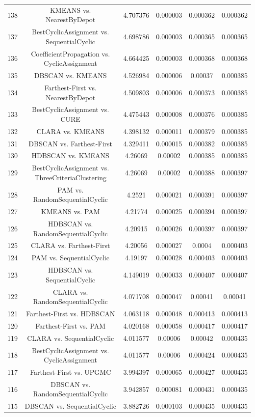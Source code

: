 \documentclass[a4paper,10pt]{article}
\begin{document}
\begin{landscape}
\begin{table}[!htp]
\begin{tabular}{cccccc}
138&KMEANS vs. NearestByDepot&4.707376&0.000003&0.000362&0.000362\\
137&BestCyclicAssignment vs. SequentialCyclic&4.698786&0.000003&0.000365&0.000365\\
136&CoefficientPropagation vs. CyclicAssignment&4.664425&0.000003&0.000368&0.000368\\
135&DBSCAN vs. KMEANS&4.526984&0.000006&0.00037&0.000385\\
134&Farthest-First vs. NearestByDepot&4.509803&0.000006&0.000373&0.000385\\
133&BestCyclicAssignment vs. CURE&4.475443&0.000008&0.000376&0.000385\\
132&CLARA vs. KMEANS&4.398132&0.000011&0.000379&0.000385\\
131&DBSCAN vs. Farthest-First&4.329411&0.000015&0.000382&0.000385\\
130&HDBSCAN vs. KMEANS&4.26069&0.00002&0.000385&0.000385\\
129&BestCyclicAssignment vs. ThreeCriteriaClustering&4.26069&0.00002&0.000388&0.000397\\
128&PAM vs. RandomSequentialCyclic&4.2521&0.000021&0.000391&0.000397\\
127&KMEANS vs. PAM&4.21774&0.000025&0.000394&0.000397\\
126&HDBSCAN vs. RandomSequentialCyclic&4.20915&0.000026&0.000397&0.000397\\
125&CLARA vs. Farthest-First&4.20056&0.000027&0.0004&0.000403\\
124&PAM vs. SequentialCyclic&4.19197&0.000028&0.000403&0.000403\\
123&HDBSCAN vs. SequentialCyclic&4.149019&0.000033&0.000407&0.000407\\
122&CLARA vs. RandomSequentialCyclic&4.071708&0.000047&0.00041&0.00041\\
121&Farthest-First vs. HDBSCAN&4.063118&0.000048&0.000413&0.000413\\
120&Farthest-First vs. PAM&4.020168&0.000058&0.000417&0.000417\\
119&CLARA vs. SequentialCyclic&4.011577&0.00006&0.00042&0.000435\\
118&BestCyclicAssignment vs. CyclicAssignment&4.011577&0.00006&0.000424&0.000435\\
117&Farthest-First vs. UPGMC&3.994397&0.000065&0.000427&0.000435\\
116&DBSCAN vs. RandomSequentialCyclic&3.942857&0.000081&0.000431&0.000435\\
115&DBSCAN vs. SequentialCyclic&3.882726&0.000103&0.000435&0.000435\\

\end{tabular}
\end{table}
\end{landscape}
\end{document}
